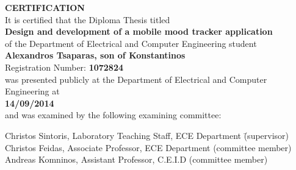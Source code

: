 \thispagestyle{empty}

\begin{center}
    \textbf{\LARGE CERTIFICATION}\\[2em]
    
    It is certified that the Diploma Thesis titled \\[1em]
    
    \textbf{\Large Design and development of a mobile mood tracker application} \\[2em]
    
    of the Department of Electrical and Computer Engineering student \\[2em]
    
    \textbf{\large Alexandros Tsaparas, son of Konstantinos} \\[1em]
    
    Registration Number: \textbf{1072824} \\[2em]
    
    was presented publicly at the Department of Electrical and Computer Engineering at \\[2em]
    
    \textbf{14/09/2014} \\[2em]
    
    and was examined by the following examining committee: \\[3em]
    
    \begin{tabbing}
        Christos Sintoris, Laboratory Teaching Staff, ECE Department \hspace{1cm} \= (supervisor) \\
        Christos Feidas, Associate Professor, ECE Department \> (committee member) \\
        Andreas Komninos, Assistant Professor, C.E.I.D \> (committee member)
    \end{tabbing}
    
    \vfill
    

\end{center}
